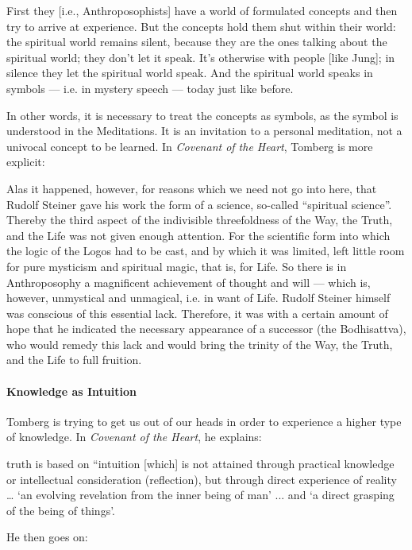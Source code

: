 \begin{quotationx}
First they [i.e., Anthroposophists] have a world of formulated concepts and then try to arrive at experience. But the
concepts hold them shut within their world: the spiritual world remains silent, because they are the ones talking about
the spiritual world; they don't let it speak. It's otherwise with people [like Jung]; in
silence they let the spiritual world speak. And the spiritual world speaks in symbols — i.e. in mystery
speech — today just like before. 

\end{quotationx}
In other words, it is necessary to treat the concepts as symbols, as the symbol is understood in the Meditations. It is
an invitation to a personal meditation, not a univocal concept to be learned. In \emph{Covenant of the Heart}, Tomberg
is more explicit:

\begin{quotex}
Alas it happened, however, for reasons which we need not go into here, that Rudolf Steiner gave his work the form of a
science, so-called “spiritual science”. Thereby the third aspect of the indivisible threefoldness of the Way, the
Truth, and the Life was not given enough attention. For the scientific form into which the logic of the Logos had to be
cast, and by which it was limited, left little room for pure mysticism and spiritual magic, that is, for Life. So there
is in Anthroposophy a magnificent achievement of thought and will — which is, however, unmystical and
unmagical, i.e. in want of Life. Rudolf Steiner himself was conscious of this essential lack. Therefore, it was with a
certain amount of hope that he indicated the necessary appearance of a successor (the Bodhisattva), who would remedy
this lack and would bring the trinity of the Way, the Truth, and the Life to full fruition. 

\end{quotex}
\paragraph{Knowledge as Intuition}
Tomberg is trying to get us out of our heads in order to experience a higher type of knowledge. In \emph{Covenant of the
Heart}, he explains:

\begin{quotationx}
truth is based on “intuition [which] is not attained through practical knowledge or intellectual consideration
(reflection), but through direct experience of reality … `an evolving revelation from the inner being of
man’ ... and `a direct grasping of the being of things'.

\end{quotationx}
He then goes on:

